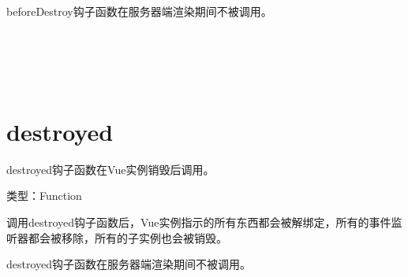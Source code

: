 beforeDestroy钩子函数在服务器端渲染期间不被调用。





\begin{lstlisting}[language=JavaScript]

\end{lstlisting}




\begin{lstlisting}[language=JavaScript]

\end{lstlisting}




\begin{lstlisting}[language=JavaScript]

\end{lstlisting}




\begin{lstlisting}[language=JavaScript]

\end{lstlisting}




\begin{lstlisting}[language=JavaScript]

\end{lstlisting}




\begin{lstlisting}[language=JavaScript]

\end{lstlisting}






\section{destroyed}




destroyed钩子函数在Vue实例销毁后调用。




\begin{compactitem}
\item 类型：Function
\end{compactitem}

调用destroyed钩子函数后，Vue实例指示的所有东西都会被解绑定，所有的事件监听器都会被移除，所有的子实例也会被销毁。

destroyed钩子函数在服务器端渲染期间不被调用。



